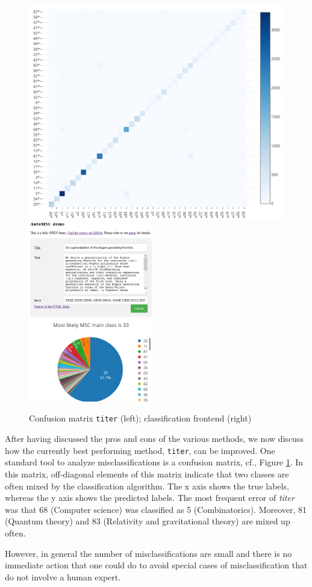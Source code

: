 \begin{figure}[t]
  \centering
  \includegraphics[width=.48\textwidth]{confusion.png}
  \includegraphics[width=0.48\textwidth]{webFrontend.png}
  \caption{Confusion matrix \texttt{titer} (left); classification frontend (right)}\label{fgScreenshot}\label{fgConfusion}
\end{figure}
After having discussed the pros and cons of the various methods, we now discuss how the currently best performing method, \texttt{titer}, can be improved. 
One standard tool to analyze misclassifications is a confusion matrix, cf., Figure \ref{fgConfusion}.
In this matrix, off-diagonal elements of this matrix indicate that two classes are often mixed by the classification algorithm.
The x axis shows the true labels, whereas the y axis shows the predicted labels.
The most frequent error of \textit{titer} was that 68 (Computer science) was classified as 5 (Combinatorics).
Moreover, 81 (Quantum theory) and 83 (Relativity and gravitational theory) are mixed up often.


However, in general the number of misclassifications are small and there is no immediate action that one could do to avoid special cases of misclassification that do not involve a human expert.


